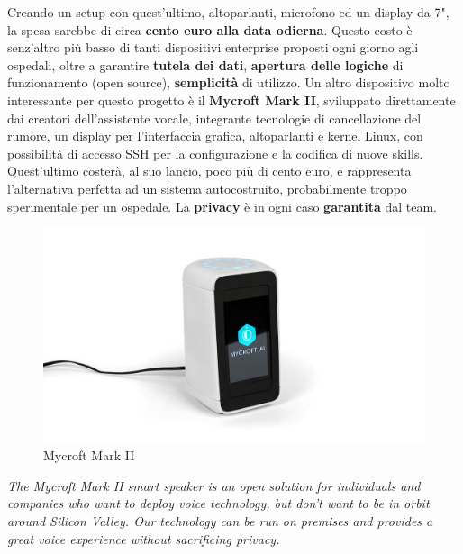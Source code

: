 Creando un setup con quest'ultimo, altoparlanti, microfono ed un display da 7", la spesa sarebbe di circa \textbf{cento euro alla data odierna}. Questo costo è senz'altro più basso di tanti dispositivi enterprise proposti ogni giorno agli ospedali, oltre a garantire \textbf{tutela dei dati}, \textbf{apertura delle logiche} di funzionamento (open source), \textbf{semplicità} di utilizzo. Un altro dispositivo molto interessante per questo progetto è il \textbf{Mycroft Mark II}, sviluppato direttamente dai creatori dell'assistente vocale, integrante tecnologie di cancellazione del rumore, un display per l'interfaccia grafica, altoparlanti e kernel Linux, con possibilità di accesso SSH per la configurazione e la codifica di nuove skills. Quest'ultimo costerà, al suo lancio, poco più di cento euro, e rappresenta l'alternativa perfetta ad un sistema autocostruito, probabilmente troppo sperimentale per un ospedale. La \textbf{privacy} è in ogni caso \textbf{garantita} dal team.
\begin{figure}[H]
  \begin{center}
    \includegraphics[width=0.8\columnwidth]{images/applicabilita/Mark_II.jpg}
  \end{center}
  \caption{Mycroft Mark II}
  \label{fig:mark-II}
\end{figure}
\begin{center}
  \textit{The Mycroft Mark II smart speaker is an open solution for individuals and companies who want to deploy voice technology, but don’t want to be in orbit around Silicon Valley.  Our technology can be run on premises and provides a great voice experience without sacrificing privacy.}
\end{center}

